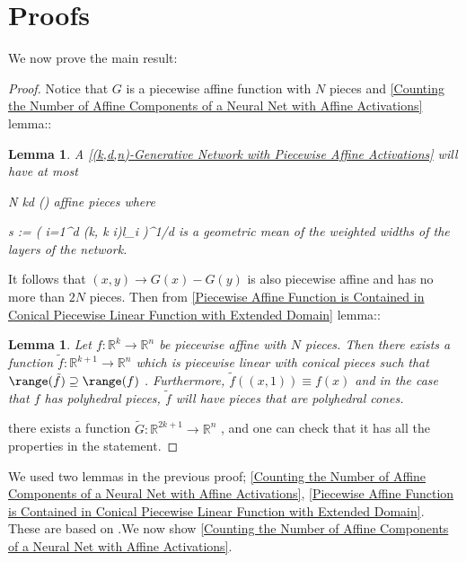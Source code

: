 \documentclass{article}
\newtheorem{lemma}[theorem]{Lemma}
\begin{document}
\section{Proofs}\label{section:Proofs}
We now prove the main result:
\begin{proof}
Notice that  $G$  is a piecewise affine function with  $N$  pieces and \autoref{Counting the Number of Affine Components of a Neural Net with Affine Activations} lemma::
\begin{lemma}
A \autoref{(k,d,n)-Generative Network with Piecewise Affine Activations} will have at most

\log N \leq kd \log\left(\right)  
affine pieces where

s := \left( \prod \textit{{i=1}^d \max(k, k} i)l_i \right)^{1/d}  
is a geometric mean of the weighted widths of the layers of the network.

\end{lemma}

It follows that  $(x,y) \to G(x) - G(y)$  is also piecewise affine and has no more than  $2N$  pieces.
Then from  \autoref{Piecewise Affine Function is Contained in Conical Piecewise Linear Function with Extended Domain} lemma::
\begin{lemma}
Let  $f:\mathbb{R}^k\to\mathbb{R}^n$  be piecewise affine with  $N$  pieces. Then there exists a function  $\tilde{f}:\mathbb{R}^{k+1} \to \mathbb{R}^n$  which is piecewise linear with conical pieces such that  $\range(\tilde{f})\supseteq\range(f)$ . Furthermore,  $\tilde{f}((x,1)) \equiv f(x)$  and in the case that  $f$  has polyhedral pieces,  $\tilde{f}$  will have pieces that are polyhedral cones.

\end{lemma}
 there exists a function  $\tilde{G}:\mathbb{R}^{2k + 1} \to \mathbb{R}^n$ , and one can check that it has all the properties in the statement.

\end{proof}
We used two lemmas in the previous proof; \autoref{Counting the Number of Affine Components of a Neural Net with Affine Activations}, \autoref{Piecewise Affine Function is Contained in Conical Piecewise Linear Function with Extended Domain}. These are based on \cite{vershyninHighDimensionalProbabilityIntroduction2018}.We now show \autoref{Counting the Number of Affine Components of a Neural Net with Affine Activations}.
\end{document}
